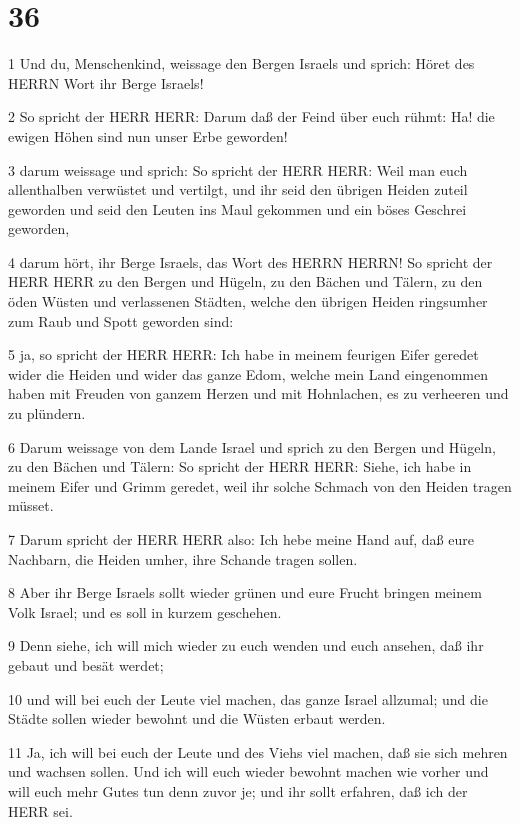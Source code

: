 \chapter{36}

\par 1 Und du, Menschenkind, weissage den Bergen Israels und sprich: Höret des HERRN Wort ihr Berge Israels!
\par 2 So spricht der HERR HERR: Darum daß der Feind über euch rühmt: Ha! die ewigen Höhen sind nun unser Erbe geworden!
\par 3 darum weissage und sprich: So spricht der HERR HERR: Weil man euch allenthalben verwüstet und vertilgt, und ihr seid den übrigen Heiden zuteil geworden und seid den Leuten ins Maul gekommen und ein böses Geschrei geworden,
\par 4 darum hört, ihr Berge Israels, das Wort des HERRN HERRN! So spricht der HERR HERR zu den Bergen und Hügeln, zu den Bächen und Tälern, zu den öden Wüsten und verlassenen Städten, welche den übrigen Heiden ringsumher zum Raub und Spott geworden sind:
\par 5 ja, so spricht der HERR HERR: Ich habe in meinem feurigen Eifer geredet wider die Heiden und wider das ganze Edom, welche mein Land eingenommen haben mit Freuden von ganzem Herzen und mit Hohnlachen, es zu verheeren und zu plündern.
\par 6 Darum weissage von dem Lande Israel und sprich zu den Bergen und Hügeln, zu den Bächen und Tälern: So spricht der HERR HERR: Siehe, ich habe in meinem Eifer und Grimm geredet, weil ihr solche Schmach von den Heiden tragen müsset.
\par 7 Darum spricht der HERR HERR also: Ich hebe meine Hand auf, daß eure Nachbarn, die Heiden umher, ihre Schande tragen sollen.
\par 8 Aber ihr Berge Israels sollt wieder grünen und eure Frucht bringen meinem Volk Israel; und es soll in kurzem geschehen.
\par 9 Denn siehe, ich will mich wieder zu euch wenden und euch ansehen, daß ihr gebaut und besät werdet;
\par 10 und will bei euch der Leute viel machen, das ganze Israel allzumal; und die Städte sollen wieder bewohnt und die Wüsten erbaut werden.
\par 11 Ja, ich will bei euch der Leute und des Viehs viel machen, daß sie sich mehren und wachsen sollen. Und ich will euch wieder bewohnt machen wie vorher und will euch mehr Gutes tun denn zuvor je; und ihr sollt erfahren, daß ich der HERR sei.
